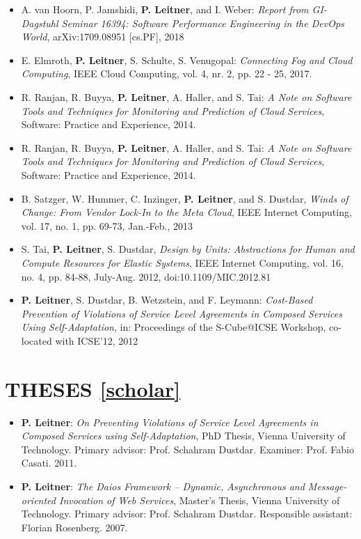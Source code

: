 \documentclass[paper=letter,fontsize=11pt]{scrartcl} %
\newcommand{\NewPart}[2]{\section*{\uppercase{#1} #2}}
\begin{document}
\begin{itemize}
	\item A. van Hoorn, P. Jamshidi, \textbf{P. Leitner}, and I. Weber:
	\emph{Report from GI-Dagstuhl Seminar 16394: Software Performance Engineering in the DevOps World}, arXiv:1709.08951 [cs.PF], 2018
	\item E. Elmroth, \textbf{P. Leitner}, S. Schulte, S. Venugopal:
  \emph{Connecting Fog and Cloud Computing}, IEEE Cloud Computing, vol. 4, nr. 2, pp. 22 - 25, 2017.
	\item R. Ranjan, R. Buyya, \textbf{P. Leitner}, A. Haller, and S. Tai:
  \emph{A Note on Software Tools and Techniques for Monitoring and Prediction of Cloud Services}, Software: Practice and Experience, 2014.
  \item R. Ranjan, R. Buyya, \textbf{P. Leitner}, A. Haller, and S. Tai:
  \emph{A Note on Software Tools and Techniques for Monitoring and Prediction of Cloud Services}, Software: Practice and Experience, 2014.
  \item B. Satzger, W. Hummer, C. Inzinger, \textbf{P. Leitner}, and S. Dustdar, \emph{Winds of Change: From Vendor Lock-In to the Meta Cloud}, IEEE Internet Computing, vol. 17, no. 1, pp. 69-73, Jan.-Feb., 2013
  \item S. Tai, \textbf{P. Leitner}, S. Dustdar, \emph{Design by Units: Abstractions for Human and Compute Resources for Elastic Systems}, IEEE Internet Computing, vol. 16, no. 4, pp. 84-88, July-Aug. 2012, doi:10.1109/MIC.2012.81
  \item \textbf{P. Leitner}, S. Dustdar, B. Wetzstein, and F.
  Leymann: \emph{Cost-Based Prevention of Violations of Service Level Agreements
  in Composed Services Using Self-Adaptation}, in: Proceedings of the S-Cube@ICSE Workshop, co-located with ICSE'12, 2012
\end{itemize}

\NewPart{Theses}{\href{https://scholar.google.ch/citations?user=wZ9f8CAAAAAJ}{[scholar]}}

\begin{itemize}
  \item \textbf{P. Leitner}: \emph{On Preventing Violations of Service Level
  Agreements in Composed Services using Self-Adaptation},  PhD Thesis, Vienna
  University of Technology. Primary advisor: Prof. Schahram Dustdar. Examiner:
  Prof. Fabio Casati. 2011.
  \item \textbf{P. Leitner}: \emph{The Daios Framework -- Dynamic, Asynchronous
  and Message-oriented Invocation of Web Services},  Master's Thesis, Vienna
  University of Technology. Primary advisor: Prof. Schahram Dustdar. Responsible
  assistant: Florian Rosenberg. 2007.
\end{itemize}
\end{document}
